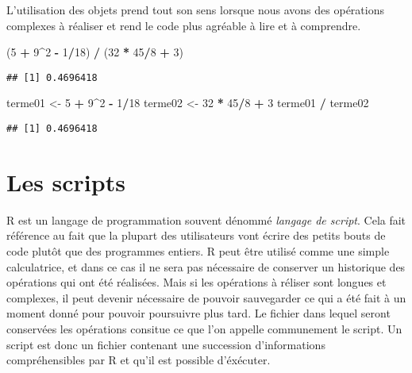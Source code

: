 \documentclass[]{book}
\newenvironment{Shaded}{\begin{snugshade}}{\end{snugshade}}
\newcommand{\DecValTok}[1]{\textcolor[rgb]{0.00,0.00,0.81}{#1}}
\newcommand{\StringTok}[1]{\textcolor[rgb]{0.31,0.60,0.02}{#1}}
\newcommand{\OperatorTok}[1]{\textcolor[rgb]{0.81,0.36,0.00}{\textbf{#1}}}
\newcommand{\NormalTok}[1]{#1}
\theoremstyle{definition}
\theoremstyle{definition}
\theoremstyle{definition}
\theoremstyle{remark}
\begin{document}
L'utilisation des objets prend tout son sens lorsque nous avons des
opérations complexes à réaliser et rend le code plus agréable à lire et
à comprendre.

\begin{Shaded}
\begin{Highlighting}[]
\NormalTok{(}\DecValTok{5} \OperatorTok{+}\StringTok{ }\DecValTok{9}\OperatorTok{^}\DecValTok{2} \OperatorTok{-}\StringTok{ }\DecValTok{1}\OperatorTok{/}\DecValTok{18}\NormalTok{) }\OperatorTok{/}\StringTok{ }\NormalTok{(}\DecValTok{32} \OperatorTok{*}\StringTok{ }\DecValTok{45}\OperatorTok{/}\DecValTok{8} \OperatorTok{+}\StringTok{ }\DecValTok{3}\NormalTok{)}
\end{Highlighting}
\end{Shaded}

\begin{verbatim}
## [1] 0.4696418
\end{verbatim}

\begin{Shaded}
\begin{Highlighting}[]
\NormalTok{terme01 <-}\StringTok{ }\DecValTok{5} \OperatorTok{+}\StringTok{ }\DecValTok{9}\OperatorTok{^}\DecValTok{2} \OperatorTok{-}\StringTok{ }\DecValTok{1}\OperatorTok{/}\DecValTok{18}
\NormalTok{terme02 <-}\StringTok{ }\DecValTok{32} \OperatorTok{*}\StringTok{ }\DecValTok{45}\OperatorTok{/}\DecValTok{8} \OperatorTok{+}\StringTok{ }\DecValTok{3}
\NormalTok{terme01 }\OperatorTok{/}\StringTok{ }\NormalTok{terme02}
\end{Highlighting}
\end{Shaded}

\begin{verbatim}
## [1] 0.4696418
\end{verbatim}

\section{Les scripts}\label{les-scripts}

R est un langage de programmation souvent dénommé \emph{langage de
script}. Cela fait référence au fait que la plupart des utilisateurs
vont écrire des petits bouts de code plutôt que des programmes entiers.
R peut être utilisé comme une simple calculatrice, et dans ce cas il ne
sera pas nécessaire de conserver un historique des opérations qui ont
été réalisées. Mais si les opérations à réliser sont longues et
complexes, il peut devenir nécessaire de pouvoir sauvegarder ce qui a
été fait à un moment donné pour pouvoir poursuivre plus tard. Le fichier
dans lequel seront conservées les opérations consitue ce que l'on
appelle communement le script. Un script est donc un fichier contenant
une succession d'informations compréhensibles par R et qu'il est
possible d'éxécuter.
\end{document}

